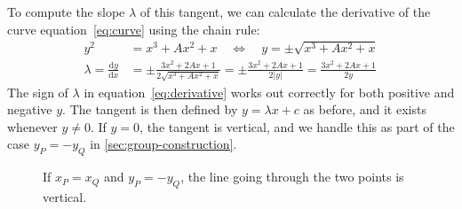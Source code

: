\documentclass[manuscript]{acmart}
\begin{document}
To compute the slope $\lambda$ of this tangent, we can calculate the derivative of the curve equation~\eqref{eq:curve} using the chain rule:
\begin{align}
y^2 &= x^3 + A x^2 + x \quad\iff\quad y = \pm\sqrt{x^3 + A x^2 + x}\\[5pt]
\lambda = \frac{\mathrm{d}y}{\mathrm{d}x} &= \pm\frac{3x^2 + 2Ax + 1}{2\sqrt{x^3 + Ax^2 + x}}
= \pm\frac{3x^2 + 2Ax + 1}{2|y|}
= \frac{3x^2 + 2Ax + 1}{2y} \label{eq:derivative}
\end{align}
The sign of $\lambda$ in equation~\eqref{eq:derivative} works out correctly for both positive and negative $y$.
The tangent is then defined by $y = \lambda x + c$ as before, and it exists whenever $y \ne 0$.
If $y=0$, the tangent is vertical, and we handle this as part of the case $y_P=-y_Q$ in \autoref{sec:group-construction}.

\begin{figure}
\centering
\caption{If $x_P=x_Q$ and $y_P=-y_Q$, the line going through the two points is vertical.}
\label{fig:vertical}
\end{figure}
\end{document}
